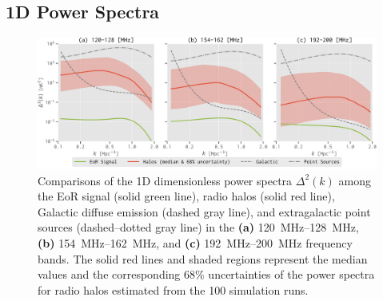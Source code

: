 \documentclass[twocolumn]{aastex62}
\begin{document}
\subsection{1D Power Spectra}
\label{sec:ps1d}

\begin{figure}
  \centering
  \includegraphics[width=\textwidth]{ps1d-3bands}
  \caption{\label{fig:ps1d-3bands}%
    Comparisons of the 1D dimensionless power spectra $\Delta^2(k)$
    among the EoR signal (solid green line), radio halos (solid red line),
    Galactic diffuse emission (dashed gray line), and extragalactic point
    sources (dashed--dotted gray line) in the
    \textbf{(a)} \SIrange{120}{128}{\MHz},
    \textbf{(b)} \SIrange{154}{162}{\MHz}, and
    \textbf{(c)} \SIrange{192}{200}{\MHz} frequency bands.
    The solid red lines and shaded regions represent the median values
    and the corresponding 68\% uncertainties of the power
    spectra for radio halos estimated from the 100 simulation runs.
  }
\end{figure}
\end{document}
